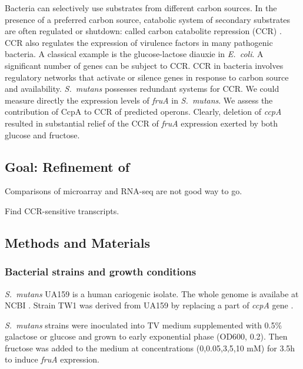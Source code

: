 \documentclass{article}
\begin{document}
Bacteria can selectively use substrates from different carbon sources. In the
presence of a
preferred carbon source, catabolic system of secondary substrates are often
regulated or shutdown: called carbon catabolite repression (CCR)
\cite{Gorke2008}. CCR also regulates the expression of virulence factors in many
pathogenic bacteria. A classical example is the glucose-lactose diauxie in
\textit{E.\ coli}. A significant number of genes can be subject to CCR.  
CCR in bacteria involves regulatory networks that activate or silence genes in
response to carbon source and availability.
\textit{S.\ mutans} possesses redundant systems for CCR.
We could measure directly the expression levels of \textit{fruA} in \textit{S.\
mutans}. 
We assess the contribution of CcpA to CCR of predicted operons.
Clearly, deletion of \textit{ccpA} resulted in substantial relief of the CCR of
\textit{fruA}
expression exerted by both glucose and fructose.


\subsection{Goal: Refinement of \cite{Abranches2008}}

Comparisons of microarray and RNA-seq are not good way to go.

Find CCR-sensitive transcripts.

\subsection{Methods and Materials}

\subsubsection{Bacterial strains and growth conditions}
\textit{S.\ mutans} UA159 is a human cariogenic isolate. The whole genome is
availabe at NCBI \cite{Ajdic2002}. Strain TW1 was derived from UA159 by
replacing a part of \textit{ccpA} gene \cite{Wen2002}. 

\textit{S.\ mutans} strains were inoculated into TV medium supplemented with
0.5\% galactose or glucose and grown to early exponential phase (OD600, 0.2).
Then fructose was added to the medium at concentrations (0,0.05,3,5,10 mM) for
3.5h to induce \textit{fruA} expression.
\end{document}
